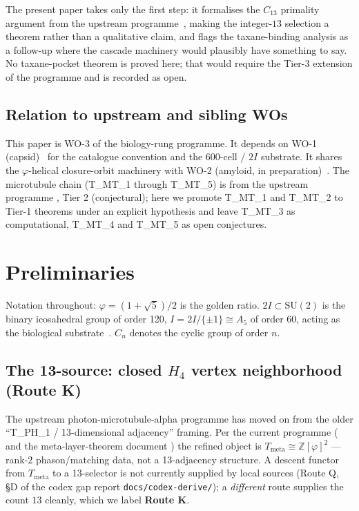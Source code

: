 \documentclass[12pt]{article}
\newcommand{\phig}{\varphi}
\begin{document}
The present paper takes only the first step: it formalises the
$C_{13}$ primality argument from the upstream
programme~\cite{CascadePhotonMicrotubuleAlpha}, making the
integer-$13$ selection a theorem rather than a qualitative claim,
and flags the taxane-binding analysis as a follow-up where the
cascade machinery would plausibly have something to say. No
taxane-pocket theorem is proved here; that would require the
Tier-3 extension of the programme and is recorded as open.

\subsection{Relation to upstream and sibling WOs}

This paper is WO-3 of the biology-rung programme. It depends on
WO-1 (capsid)~\cite{SmartCapsid} for the catalogue convention and
the 600-cell / $2I$ substrate. It shares the $\phig$-helical
closure-orbit machinery with WO-2 (amyloid, in
preparation)~\cite{SmartAmyloid}. The microtubule chain
(T\_MT\_1 through T\_MT\_5) is from the upstream programme
\cite{CascadePhotonMicrotubuleAlpha}, Tier 2 (conjectural); here
we promote T\_MT\_1 and T\_MT\_2 to Tier-1 theorems under an
explicit hypothesis and leave T\_MT\_3 as computational, T\_MT\_4
and T\_MT\_5 as open conjectures.

\section{Preliminaries}\label{sec:prelim}

Notation throughout: $\phig = (1+\sqrt{5})/2$ is the golden ratio.
$2I \subset \mathrm{SU}(2)$ is the binary icosahedral group of
order 120, $I = 2I/\{\pm 1\} \cong A_5$ of order 60, acting as the
biological substrate~\cite[\S 2.1--2.3]{CascadeBio}. $C_n$ denotes
the cyclic group of order $n$.

\subsection{The 13-source: closed $H_4$ vertex neighborhood (Route K)}

The upstream photon-microtubule-alpha programme has moved on
from the older ``T\_PH\_1 / 13-dimensional adjacency'' framing.
Per the current programme
(\cite{CascadePhotonMicrotubuleAlpha} and the
meta-layer-theorem document
\cite{CascadeMetaLayerTheorem}) the refined
object is $T_{\mathrm{meta}} \cong \mathbb{Z}[\varphi]^2$ ---
rank-$2$ phason/matching data, not a 13-adjacency structure.
A descent functor from $T_{\mathrm{meta}}$ to a
13-selector is not currently supplied by local sources (Route Q,
\S D of the codex gap report \texttt{docs/codex-derive/}); a
\emph{different} route supplies the count $13$ cleanly, which we
label \textbf{Route K}.
\end{document}
